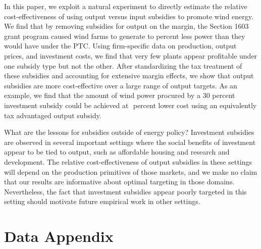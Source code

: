 \documentclass[12pt]{article}
\begin{document}
In this paper, we exploit a natural experiment to directly estimate the relative cost-effectiveness of using output versus input subsidies to promote wind energy. We find that by removing subsidies for output on the margin, the Section 1603 grant program caused wind farms to generate  \unskip to percent less power than they would have under the PTC. Using firm-specific data on production, output prices, and investment costs, we find that very few plants appear profitable under one subsidy type but not the other. After standardizing the tax treatment of these subsidies and accounting for extensive margin effects, we show that output subsidies are more cost-effective over a large range of output targets. As an example, we find that the amount of wind power procured by a 30 percent investment subsidy could be achieved at $$ percent lower cost using an equivalently tax advantaged output subsidy.

What are the lessons for subsidies outside of energy policy? Investment subsidies are observed in several important settings where the social benefits of investment appear to be tied to output, such as affordable housing and research and development. The relative cost-effectiveness of output subsidies in these settings will depend on the production primitives of those markets, and we make no claim that our results are informative about optimal targeting in those domains. Nevertheless, the fact that investment subsidies appear poorly targeted in this setting should motivate future empirical work in other settings.

\pagebreak
\begin{singlespace}


\end{singlespace}

\appendix
\makeatletter
\def\@seccntformat#1{\csname Pref@#1\endcsname \csname the#1\endcsname\quad}
\def\Pref@section{Appendix~}
\makeatother



\clearpage
\section{Data Appendix \label{sec:Data_Appendix}}
\end{document}

